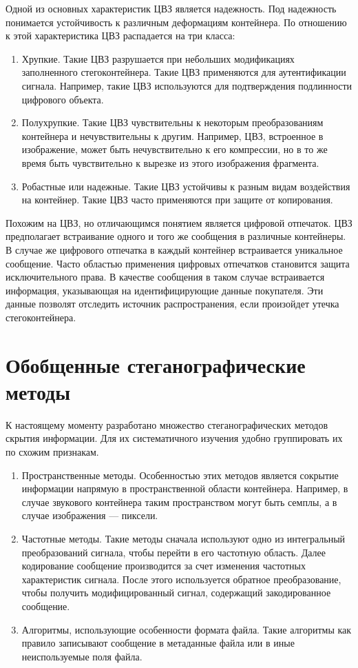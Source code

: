 Одной из основных характеристик ЦВЗ является надежность.
Под надежность понимается устойчивость к различным деформациям контейнера.
По отношению к этой характеристика ЦВЗ распадается на три класса:
\begin{enumerate}
    \item Хрупкие.
    Такие ЦВЗ разрушается при небольших модификациях заполненного стегоконтейнера.
    Такие ЦВЗ применяются для аутентификации сигнала.
    Например, такие ЦВЗ используются для подтверждения подлинности цифрового объекта.
    \item Полухрупкие.
    Такие ЦВЗ чувствительны к некоторым преобразованиям контейнера и нечувствительны к другим.
    Например, ЦВЗ, встроенное в изображение, может быть нечувствительно к его компрессии,
    но в то же время быть чувствительно к вырезке из этого изображения фрагмента.
    \item Робастные или надежные.
    Такие ЦВЗ устойчивы к разным видам воздействия на контейнер.
    Такие ЦВЗ часто применяются при защите от копирования.
\end{enumerate}

Похожим на ЦВЗ, но отличающимся понятием является цифровой отпечаток.
ЦВЗ предполагает встраивание одного и того же сообщения в различные контейнеры.
В случае же цифрового отпечатка в каждый контейнер встраивается уникальное сообщение.
Часто областью применения цифровых отпечатков становится защита исключительного права.
В качестве сообщения в таком случае встраивается информация, указывающая на идентифицирующие данные покупателя.
Эти данные позволят отследить источник распространения, если произойдет утечка стегоконтейнера.

\section{Обобщенные стеганографические методы}
К настоящему моменту разработано множество стеганографических методов скрытия информации.
Для их систематичного изучения удобно группировать их по схожим признакам.
\begin{enumerate}
    \item Пространственные методы. Особенностью этих методов является сокрытие информации напрямую
    в пространственной области контейнера. Например,
    в случае звукового контейнера  таким пространством могут быть семплы,
    а в случае изображения --- пиксели.
    \item Частотные методы. Такие методы сначала используют одно из интегральный преобразований сигнала,
    чтобы перейти в его частотную область. Далее кодирование сообщение производится за счет изменения частотных
    характеристик сигнала. После этого используется обратное преобразование, чтобы получить модифицированный сигнал,
    содержащий закодированное сообщение.
    \item Алгоритмы, использующие особенности формата файла. Такие алгоритмы как правило записывают
    сообщение в метаданные файла или в иные неиспользуемые поля файла.
\end{enumerate}

